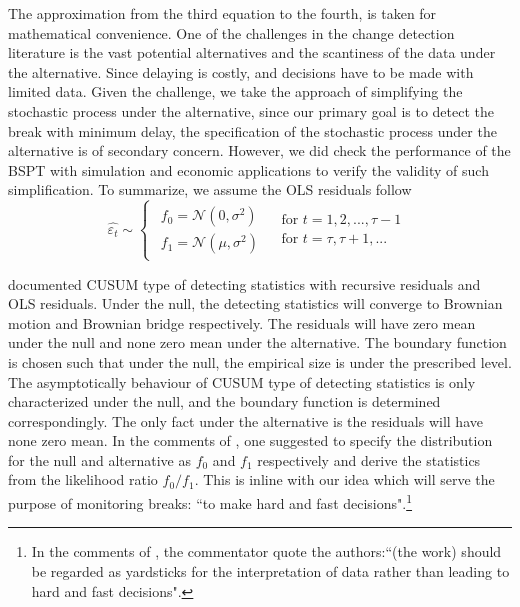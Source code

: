 \documentclass[preprint,authoryear,12pt,english]{elsarticle}
\theoremstyle{plain}
\begin{document}
The approximation from the third equation to the fourth, is taken for mathematical convenience. One of the challenges in the change detection literature is the vast potential alternatives and the scantiness of the data under the alternative. Since delaying is costly, and decisions have to be made with limited data. Given the challenge, we take the approach of simplifying the stochastic process under the alternative, since our primary goal is to detect the break with minimum delay, the specification of the stochastic process under the alternative is of secondary concern. However, we did check the performance of the BSPT with simulation and economic applications to verify the validity of such simplification. To summarize, we assume the OLS residuals follow
\begin{equation}\label{eq: error distribution}
    \hat{\varepsilon_{t}} \sim \begin{cases}
        \begin{array}{c}
            f_{0} = \mathcal{N}(0,\sigma^{2}) \\
            f_{1} = \mathcal{N}(\mu,\sigma^{2})
        \end{array} & \begin{array}{l}
            \text{for } t = 1,2,...,\tau -1 \\
            \text{for } t = \tau, \tau +1, ...
        \end{array}
    \end{cases}
\end{equation}


\cite{Zeileis2005} documented CUSUM type of detecting statistics with recursive residuals and OLS residuals. Under the null, the detecting statistics will converge to Brownian motion and Brownian bridge respectively. The residuals will have zero mean under the null and none zero mean under the alternative. The boundary function is chosen such that under the null, the empirical size is under the prescribed level. The asymptotically behaviour of CUSUM type of detecting statistics is only characterized under the null, and the boundary function is determined correspondingly. The only fact under the alternative is the residuals will have none zero mean. In the comments of \cite{Brown1975TechniquesTime}, one suggested to specify the distribution for the null and alternative as $f_{0}$ and $f_{1}$ respectively and derive the statistics from the likelihood ratio $f_{0}/f_{1}$. This is inline with our idea which will serve the purpose of monitoring breaks: ``to make hard and fast decisions".\footnote{In the comments of \cite{Brown1975TechniquesTime}, the commentator quote the authors:``(the work) should be regarded as yardsticks for the interpretation of data rather than leading to hard and fast decisions".}
\end{document}
